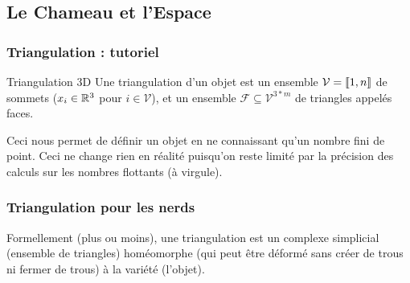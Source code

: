 \documentclass{beamercours}
\begin{document}
\subsection{Le Chameau et l'Espace}


\begin{frame}
\frametitle{Triangulation : tutoriel}
\begin{définition}{Triangulation 3D}{}
	Une triangulation d'un objet est un ensemble $\mathcal{V} = \left\llbracket 1, n\right\rrbracket$ de sommets ($x_{i} \in \mathbb{R}^{3}$ pour $i \in \mathcal{V}$), et un ensemble $\mathcal{F} \subseteq \mathcal{V}^{3 * m}$ de triangles appelés faces.
\end{définition}

Ceci nous permet de définir un objet en ne connaissant qu'un nombre fini de point.
Ceci ne change rien en réalité puisqu'on reste limité par la précision des calculs sur les nombres flottants (à virgule).
\end{frame}

\begin{frame}
\frametitle{Triangulation pour les nerds}
\begin{remarque}{}{}
	Formellement (plus ou moins), une triangulation est un complexe simplicial (ensemble de triangles) homéomorphe (qui peut être déformé sans créer de trous ni fermer de trous) à la variété (l'objet).
\end{remarque}
\end{frame}
\end{document}
